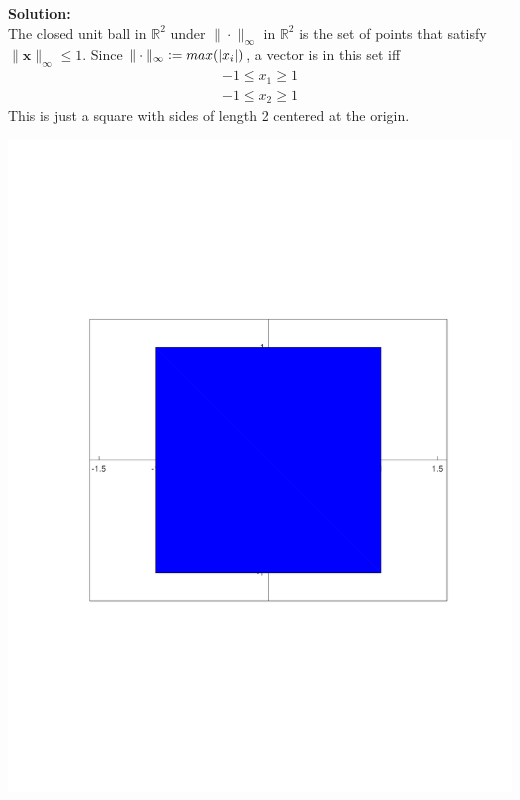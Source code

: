 \documentclass[]{article}
\newcommand{\R}{\mathbb{R}}
\newcommand{\defeq}{\vcentcolon=}
\newcommand{\solution}{\vskip 0.5cm \textbf{\large Solution:} \\}
\begin{document}
\begin{enumerate}[resume]
  \solution The closed unit ball in $\R^2$ under $\|\cdot\|_{\infty}$
  in $\R^2$ is the set of points that satisfy $\|\bm{x}\|_{\infty}
  \leq 1$. Since $\|\cdot\|_{\infty} \defeq max(|x_i|)$, a vector is
  in this set iff
  \begin{gather*}
    -1 \leq x_1 \geq 1 \\
    -1 \leq x_2 \geq 1
  \end{gather*}
  This is just a square with sides of length 2 centered at the origin.
  \begin{center}
    \includegraphics[scale=0.4]{unit_sphere_supnorm.pdf}
  \end{center}



\end{enumerate}
\end{document}
